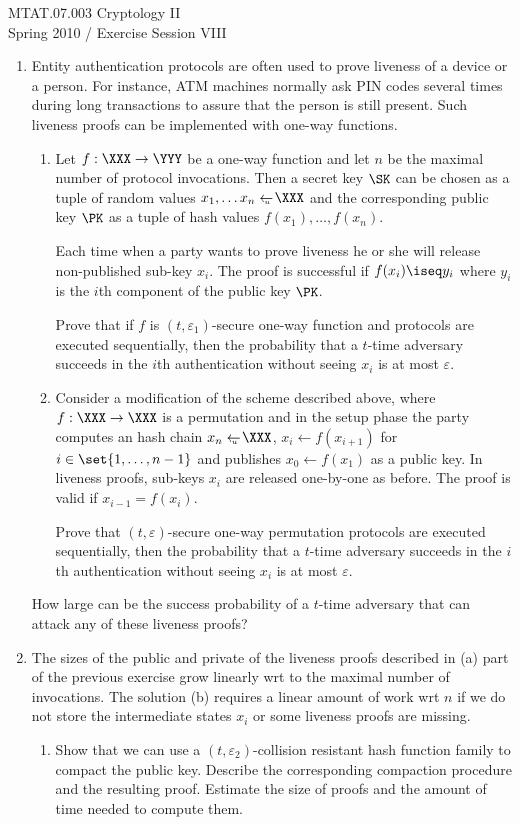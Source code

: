 \documentclass{article}
\begin{document}
\noindent	
MTAT.07.003 Cryptology II\\
Spring 2010 / Exercise Session VIII



\begin{enumerate}

\item Entity authentication protocols are often used to prove liveness
  of a device or a person. For instance, ATM machines normally ask PIN
  codes several times during long transactions to assure that the
  person is still present. Such liveness proofs can be implemented
  with one-way functions.
  \begin{enumerate}
  \item Let $f:\XXX\to\YYY$ be a one-way function and let $n$ be the
    maximal number of protocol invocations. Then a secret key $\SK$
    can be chosen as a tuple of random values $x_{1},\ldots
    x_{n}\getsu \XXX$ and the corresponding public key $\PK$ as a
    tuple of hash values $f(x_1),\ldots,f(x_n)$.

    Each time when a party wants to prove liveness he or she will
    release non-published sub-key $x_i$.  The proof is successful if
    $f(x_i)\iseq y_i$ where $y_i$ is the $i$th component of the public
    key $\PK$.
  
    Prove that if $f$ is $(t,\varepsilon_1)$-secure one-way function
    and protocols are executed sequentially, then the probability that
    a $t$-time adversary succeeds in the $i$th authentication without
    seeing $x_i$ is at most $\varepsilon$.
  \item Consider a modification of the scheme described above, where
    $f:\XXX\to\XXX$ is a permutation and in the setup phase the party
    computes an hash chain $x_n\getsu\XXX$, $x_i\gets f(x_{i+1})$ for
    $i\in\set{1,\ldots,n-1}$ and publishes $x_0\gets f(x_1)$ as a
    public key.  In liveness proofs, sub-keys $x_i$ are released
    one-by-one as before. The proof is valid if $x_{i-1}=f(x_i)$.

    Prove that $(t,\varepsilon)$-secure one-way permutation protocols
    are executed sequentially, then the probability that a $t$-time
    adversary succeeds in the $i$th authentication without seeing
    $x_i$ is at most $\varepsilon$.
\end{enumerate}
 How large can be the success probability of a $t$-time adversary that
 can attack any of these liveness proofs?
  

\item The sizes of the public and private of the liveness proofs
  described in (a) part of the previous exercise grow linearly wrt to
  the maximal number of invocations. The solution (b) requires a
  linear amount of work wrt $n$ if we do not store the intermediate
  states $x_i$ or some liveness proofs are missing.
  \begin{enumerate}
  \item Show that we can use a $(t,\varepsilon_2)$-collision resistant
    hash function family to compact the public key. Describe the
    corresponding compaction procedure and the resulting
    proof. Estimate the size of proofs and the amount of time needed
    to compute them.


\end{enumerate}
\end{enumerate}
\end{document}
